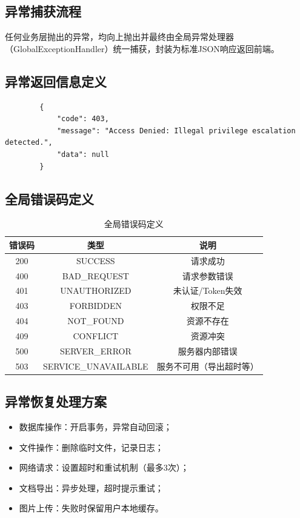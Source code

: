 \documentclass{../template/softeng}
\begin{document}
	\subsection{异常捕获流程}
	任何业务层抛出的异常，均向上抛出并最终由全局异常处理器（GlobalExceptionHandler）统一捕获，封装为标准JSON响应返回前端。

	\subsection{异常返回信息定义}
	\begin{verbatim}
		{
			"code": 403,
			"message": "Access Denied: Illegal privilege escalation detected.",
			"data": null
		}
	\end{verbatim}

	\subsection{全局错误码定义}
	\begin{table}[htbp]
		\centering
		\caption{全局错误码定义}
		\begin{tabular}{|c|c|c|}
			\hline
			\textbf{错误码} & \textbf{类型} & \textbf{说明} \\
			\hline
			200 & SUCCESS & 请求成功 \\
			400 & BAD\_REQUEST & 请求参数错误 \\
			401 & UNAUTHORIZED & 未认证/Token失效 \\
			403 & FORBIDDEN & 权限不足 \\
			404 & NOT\_FOUND & 资源不存在 \\
			409 & CONFLICT & 资源冲突 \\
			500 & SERVER\_ERROR & 服务器内部错误 \\
			503 & SERVICE\_UNAVAILABLE & 服务不可用（导出超时等） \\
			\hline
		\end{tabular}
	\end{table}

	\subsection{异常恢复处理方案}
	\begin{itemize}
		\item 数据库操作：开启事务，异常自动回滚；
		\item 文件操作：删除临时文件，记录日志；
		\item 网络请求：设置超时和重试机制（最多3次）；
		\item 文档导出：异步处理，超时提示重试；
		\item 图片上传：失败时保留用户本地缓存。
	\end{itemize}
\end{document}
